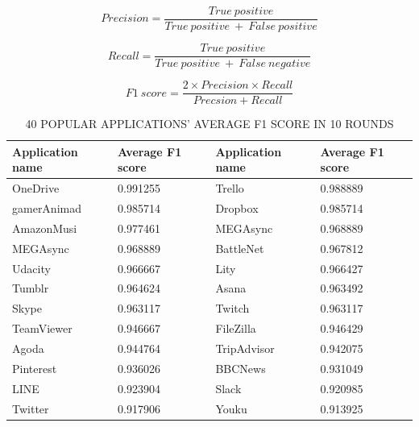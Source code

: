 \documentclass[journal]{IEEEtran}
\begin{document}
\begin{equation}
\label{eqn_1}
Precision = \dfrac{True\ positive}{True\ positive\ +\ False\ positive}
\end{equation}

\begin{equation}
\label{eqn_2}
Recall = \dfrac{True\ positive}{True\ positive\ +\ False\ negative}
\end{equation}

\begin{equation}
\label{eqn_3}
F1\ score = \dfrac{2\times Precision\times Recall}{Precsion + Recall}
\end{equation}

\begin{table}[!t]
\caption{40 POPULAR APPLICATIONS’ AVERAGE F1 SCORE IN 10 ROUNDS}
\label{table:classification_result}
\centering
\begin{tabular}{|l|l|l|l|}
\hline
Application name    & Average F1 score    & Application name  & Average F1 score   \\ \hline
OneDrive            & 0.991255            & Trello            & 0.988889           \\ \hline
gamerAnimad         & 0.985714            & Dropbox           & 0.985714           \\ \hline
AmazonMusi          & 0.977461            & MEGAsync          & 0.968889           \\ \hline
MEGAsync            & 0.968889            & BattleNet         & 0.967812           \\  \hline
Udacity             & 0.966667            & Lity              & 0.966427            \\ \hline
Tumblr              & 0.964624            & Asana             & 0.963492            \\ \hline
Skype               & 0.963117            & Twitch            & 0.963117            \\ \hline
TeamViewer          & 0.946667            & FileZilla         & 0.946429            \\ \hline
Agoda               & 0.944764            & TripAdvisor       & 0.942075            \\  \hline
Pinterest           & 0.936026            & BBCNews           & 0.931049            \\  \hline
LINE                & 0.923904            & Slack             & 0.920985            \\ \hline
Twitter             & 0.917906            & Youku             & 0.913925            \\ \hline

\end{tabular}
\end{table}
\end{document}
